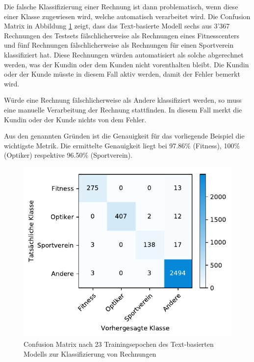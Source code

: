 Die falsche Klassifizierung einer Rechnung ist dann problematisch, wenn diese einer Klasse zugewiesen wird, welche automatisch verarbeitet wird. Die Confusion Matrix in Abbildung \ref{text-classification-cm} zeigt, dass das Text-basierte Modell sechs aus 3'367 Rechnungen des Testsets fälschlicherweise als Rechnungen eines Fitnesscenters und fünf Rechnungen fälschlicherweise als Rechnungen für einen Sportverein klassifiziert hat. Diese Rechnungen würden automatisiert als solche abgerechnet werden, was der Kundin oder dem Kunden nicht vorenthalten bleibt. Die Kundin oder der Kunde müsste in diesem Fall aktiv werden, damit der Fehler bemerkt wird.

Würde eine Rechnung fälschlicherweise als Andere klassifiziert werden, so muss eine manuelle Verarbeitung der Rechnung stattfinden. In diesem Fall merkt die Kundin oder der Kunde nichts von dem Fehler. 

Aus den genannten Gründen ist die Genauigkeit für das vorliegende Beispiel die wichtigste Metrik. Die ermittelte Genauigkeit liegt bei 97.86\% (Fitness), 100\% (Optiker) respektive 96.50\% (Sportverein).

\begin{figure}[h!] 
    \captionsetup{width=.9\linewidth}
    \caption{Confusion Matrix nach 23 Trainingsepochen des Text-basierten Modells zur Klassifizierung von Rechnungen}
    \label{text-classification-cm}
    \centering
    \includegraphics[scale=1]{graphics/matplot/textual-class__cm_22.pdf}
\end{figure}

